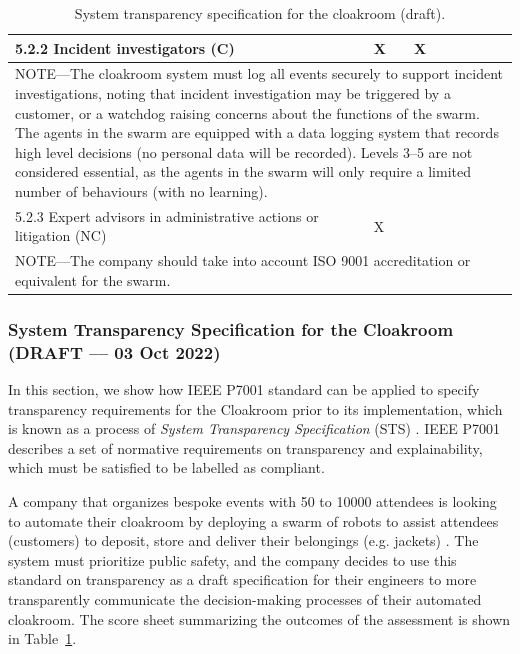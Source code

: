 \documentclass[lettersize,journal]{IEEEtran}
\begin{document}
\begin{table}[!t]
\begin{tabular}{|l| l| l| l| l| l|}
		5.2.2 Incident investigators (C) & X & X & & & \\ \hline
		\multicolumn{6}{|p{15cm}|}{NOTE—The cloakroom system must log all events securely to support incident investigations, noting that incident investigation may be triggered by a customer, or a watchdog raising concerns about the functions of the swarm. The agents in the swarm are equipped with a data logging system that records high level decisions (no personal data will be recorded). Levels 3--5 are not considered essential, as the agents in the swarm will only require a limited number of behaviours (with no learning).  }\\ \hline
		5.2.3 Expert advisors in administrative actions or litigation (NC) & X & & & & \\ \hline
		\multicolumn{6}{|p{15cm}|}{NOTE—The company should take into account ISO 9001 accreditation or equivalent for the swarm.}\\ \hline
	\end{tabular}
    \caption{\label{tab:transparency}System transparency specification for the cloakroom (draft).}
\end{table}

\subsubsection{System Transparency Specification for the Cloakroom (DRAFT –– 03 Oct 2022)}
In this section, we show how IEEE P7001 standard can be applied to specify transparency requirements for the Cloakroom prior to its implementation, which is known as a process of \textit{System Transparency Specification} (STS) \cite{IEEE-P7001}. IEEE P7001 describes a set of normative requirements on transparency and explainability, which must be satisfied to be labelled as compliant. %


A company that organizes bespoke events with 50 to 10000 attendees is looking to automate their cloakroom by deploying a swarm of robots to assist attendees (customers) to deposit, store and deliver their belongings (e.g. jackets) \cite{Jones2020}. %
The system must prioritize public safety, and the company decides to use this standard on transparency as a draft specification for their engineers to more transparently communicate the decision-making processes of their automated cloakroom. %
The score sheet summarizing the outcomes of the assessment is shown in Table~\ref{tab:transparency}. \\
\end{document}
